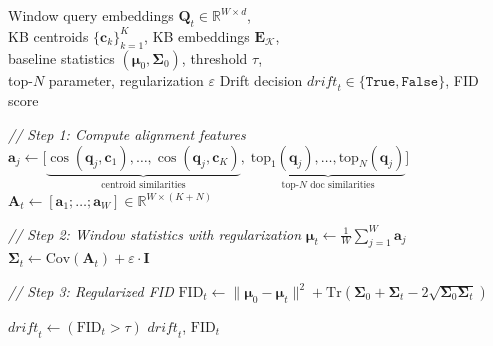 \begin{algorithm}[t]
\caption{Alignment-Feature Drift Detection (Regularized FID)}
\label{alg:drift}
\begin{algorithmic}[1]
\REQUIRE Window query embeddings $\mathbf{Q}_t \in \mathbb{R}^{W \times d}$, \\
\quad KB centroids $\{\mathbf{c}_k\}_{k=1}^{K}$, KB embeddings $\mathbf{E}_{\mathcal{K}}$, \\
\quad baseline statistics $(\boldsymbol{\mu}_0, \boldsymbol{\Sigma}_0)$, threshold $\tau$, \\
\quad top-$N$ parameter, regularization $\varepsilon$
\ENSURE Drift decision $\textit{drift}_t \in \{\texttt{True}, \texttt{False}\}$, FID score

\STATE \textit{// Step 1: Compute alignment features}
    \STATE $\mathbf{a}_j \leftarrow \big[\underbrace{\cos(\mathbf{q}_j, \mathbf{c}_1), \ldots, \cos(\mathbf{q}_j, \mathbf{c}_K)}_{\text{centroid similarities}}, \; \underbrace{\text{top}_1(\mathbf{q}_j), \ldots, \text{top}_N(\mathbf{q}_j)}_{\text{top-}N \text{ doc similarities}} \big]$
\ENDFOR
\STATE $\mathbf{A}_t \leftarrow [\mathbf{a}_1; \ldots; \mathbf{a}_W] \in \mathbb{R}^{W \times (K+N)}$

\STATE \textit{// Step 2: Window statistics with regularization}
\STATE $\boldsymbol{\mu}_t \leftarrow \frac{1}{W} \sum_{j=1}^{W} \mathbf{a}_j$
\STATE $\boldsymbol{\Sigma}_t \leftarrow \text{Cov}(\mathbf{A}_t) + \varepsilon \cdot \mathbf{I}$ 

\STATE \textit{// Step 3: Regularized FID}
\STATE $\text{FID}_t \leftarrow \|\boldsymbol{\mu}_0 - \boldsymbol{\mu}_t\|^2 + \text{Tr}\!\left(\boldsymbol{\Sigma}_0 + \boldsymbol{\Sigma}_t - 2\sqrt{\boldsymbol{\Sigma}_0 \boldsymbol{\Sigma}_t}\right)$

\STATE $\textit{drift}_t \leftarrow (\text{FID}_t > \tau)$
\RETURN $\textit{drift}_t$, $\text{FID}_t$
\end{algorithmic}
\end{algorithm}


